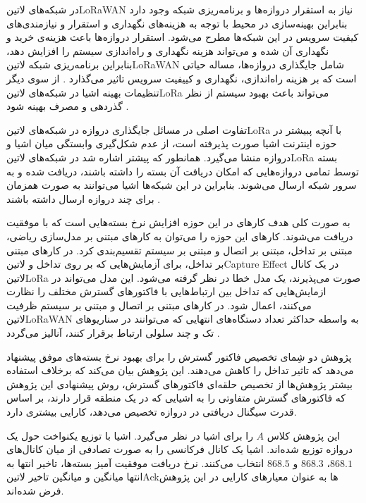 
در شبکه‌های ‌لاتین{LoRaWAN} نیاز به استقرار دروازه‌ها و برنامه‌ریزی شبکه وجود دارد بنابراین بهینه‌سازی در محیط با توجه به هزینه‌های نگهداری و استقرار و نیازمندی‌های کیفیت سرویس
در این شبکه‌ها مطرح می‌شود. استقرار دروازه‌ها باعث هزینه‌ی خرید و نگهداری آن شده و می‌تواند هزینه نگهداری و راه‌اندازی سیستم را افزایش دهد،
بنابراین برنامه‌ریزی شبکه ‌لاتین{LoRaWAN} شامل جایگذاری دروازه‌ها، مساله حیاتی است که بر هزینه راه‌اندازی، نگهداری و کییفیت سرویس تاثیر می‌گذارد
.
از سوی دیگر تنظیمات بهینه اشیا در شبکه‌های ‌لاتین{LoRa} می‌تواند باعث بهبود سیستم از نظر گذردهی و مصرف بهینه شود
.

تفاوت اصلی در مسائل جایگذاری دروازه در شبکه‌های ‌لاتین{LoRa} با آنچه پبیشتر در حوزه اینترنت اشیا صورت پذیرفته است،
از عدم شکل‌گیری وابستگی میان اشیا و دروازه منشا می‌گیرد. همانطور که پیشتر اشاره شد در شبکه‌های ‌لاتین{LoRa}
بسته توسط تمامی دروازه‌هایی که امکان دریافت آن بسته را داشته باشند، دریافت شده و به سرور شبکه ارسال می‌شوند.
بنابراین در این شبکه‌ها اشیا می‌توانند به صورت همزمان برای چند دروازه ارسال داشته باشند
.

به صورت کلی هدف کارهای در این حوزه افزایش نرخ بسته‌هایی است که با موفقیت دریافت می‌شوند.
کارهای این حوزه را می‌توان به کارهای مبتنی بر مدل‌سازی ریاضی، مبتنی بر تداخل، مبتنی بر اتصال
و مبتنی بر سیستم تقسیم‌بندی کرد.
در کارهای مبتنی بر تداخل،
برای آزمایش‌هایی که بر روی تداخل و ‌لاتین{Capture Effect}
در یک کانال ‌لاتین{LoRa} صورت می‌پذیرند، یک مدل خطا در نظر گرفته می‌شود.
این مدل می‌تواند در ازمایش‌هایی که تداخل بین ارتباط‌هایی با فاکتورهای گسترش مختلف را نظارت می‌کنند،
اعمال شود.
در کارهای مبتنی بر اتصال و مبتنی بر سیستم ظرفیت ‌لاتین{LoRaWAN} به واسطه حداکثر تعداد
دستگاه‌های انتهایی که می‌توانند در سناریوهای تک و چند سلولی ارتباط برقرار کنند، آنالیز می‌گردد
.


پژوهش  دو شِمای تخصیص فاکتور گسترش را برای بهبود نرخ بسته‌های موفق پیشنهاد می‌دهد
که تاثیر تداخل را کاهش می‌دهند.
این پژوهش بیان می‌کند که برخلاف استفاده بیشتر پژوهش‌ها از تخصیص حلقه‌ای فاکتورهای گسترش، روش پیشنهادی این
پژوهش که فاکتورهای گسترش متفاوتی را به اشیایی که در یک منطقه قرار دارند، بر اساس قدرت سیگنال دریافتی در دروازه
تخصیص می‌دهد، کارایی بیشتری دارد.

این پژوهش کلاس $A$ را برای اشیا در نظر می‌گیرد. اشیا با توزیع یکنواخت حول یک دروازه
توزیع شده‌اند. اشیا یک کانال فرکانسی را به صورت تصادفی از میان کانال‌های $868.1$، $868.3$ و $868.5$
انتخاب می‌کنند.
نرخ دریافت موفقیت آمیز بسته‌ها، تاخیر انتها به انتها میانگین و میانگین تاخیر ‌لاتین{Ack}ها
به عنوان معیارهای کارایی در این پژوهش فرض شده‌اند.

